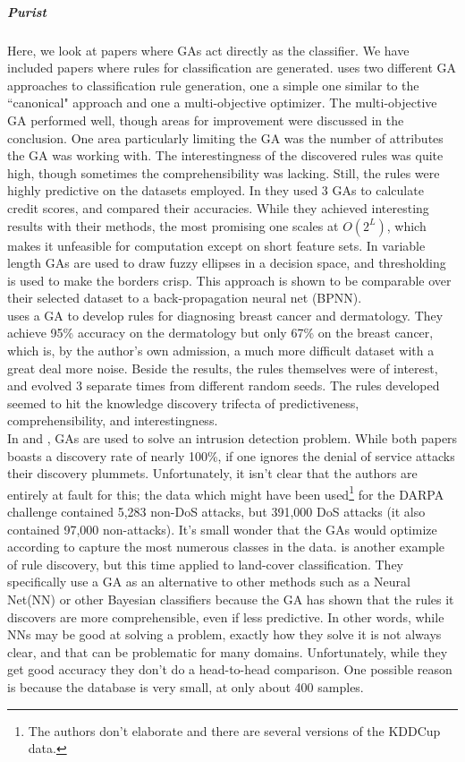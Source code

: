 \subparagraph{Purist}
Here, we look at papers where GAs act directly as the classifier.  We have included papers where rules for classification are generated.  \cite{dehuri_application_2008} uses two different GA approaches to classification rule generation, one a simple one similar to the  ``canonical" approach and one a multi-objective optimizer.  The multi-objective GA performed well, though areas for improvement were discussed in the conclusion.  One area particularly limiting the GA was the number of attributes the GA was working with.  The interestingness of the discovered rules was quite high, though sometimes the comprehensibility was lacking.  Still, the rules were highly predictive on the datasets employed.
In \cite{kozeny_genetic_2015} they used 3 GAs to calculate credit scores, and compared their accuracies.  While they achieved interesting results with their methods, the most promising one scales at $O(2^L)$, which makes it unfeasible for computation except on short feature sets.  In \cite{srikanth_variable-length_1995} variable length GAs are used to draw fuzzy ellipses in a decision space, and thresholding is used to make the borders crisp.  This approach is shown to be comparable over their selected dataset to a back-propagation neural net (BPNN).\\
\cite{fidelis_discovering_2000} uses a GA to develop rules for diagnosing breast cancer and dermatology.  They achieve 95\% accuracy on the dermatology but only 67\% on the breast cancer, which is, by the author's own admission, a much more difficult dataset with a great deal more noise.  Beside the results, the rules themselves were of interest, and evolved 3 separate times from different random seeds.   The rules developed seemed to hit the knowledge discovery trifecta of predictiveness, comprehensibility, and interestingness.\\
In \cite{hoque_implementation_2012} and \cite{li_application_2012}, GAs are used to solve an intrusion detection problem.  While both papers boasts a discovery rate of nearly 100\%, if one ignores the denial of service attacks their discovery plummets.  Unfortunately, it isn't clear that the authors are entirely at fault for this; the data which might have been used\footnote{The authors don't elaborate and there are several versions of the KDDCup data.} for the DARPA challenge contained 5,283 non-DoS attacks, but 391,000 DoS attacks (it also contained 97,000 non-attacks).  It’s small wonder that the GAs would optimize according to capture the most numerous classes in the data.
\cite{tseng_genetic_2008} is another example of rule discovery, but this time applied to land-cover classification.  They specifically use a GA as an alternative to other methods such as a Neural Net(NN) or other Bayesian classifiers because the GA has shown that the rules it discovers are more comprehensible, even if less predictive.  In other words, while NNs may be good at solving a problem, exactly how they solve it is not always clear, and that can be problematic for many domains.  Unfortunately, while they get good accuracy they don't do a head-to-head comparison.  One possible reason is because the database is very small, at only about 400 samples.\\
